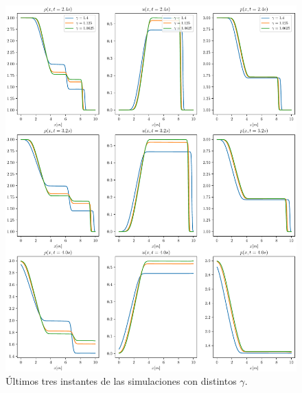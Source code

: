 \begin{figure}[ht]
	\includegraphics[width=\linewidth]{../euler1D/experimentos/graficas_sod/2.pdf}
	\caption{Últimos tres instantes de las simulaciones con distintos $\gamma$.}
\end{figure}